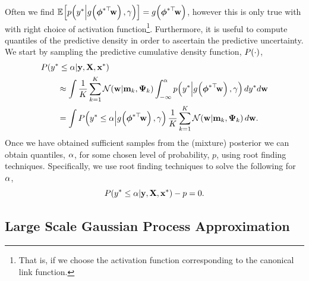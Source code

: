 \documentclass[11pt, oneside]{article}
\begin{document}
Often we find $\mathbb{E}_{}\!\left[{p\!\left({y^{*}}\middle\vert{\ensuremath{{g}_{}\!\left({{\boldsymbol\phi^{*\top}\!\mathbf{w}}}\right)},
        \ensuremath{\gamma}}\right)}\right] = {g}_{}\!\left({{\boldsymbol\phi^{*\top}\!\mathbf{w}}}\right)$, however this is only true
with with right choice of activation function\footnote{That is, if we choose
    the activation function corresponding to the canonical link function.}.
Furthermore, it is useful to compute quantiles of the predictive density in
order to ascertain the predictive uncertainty. We start by sampling the
predictive cumulative density function, $P\!\left({\cdot}\right)$,
\begin{align}
    &\ProbC{\targs\test \leq \cdfAlph}{\targ, \ins, \inss\test} \nonumber\\ 
    &\qquad\approx \int 
    \frac{1}{K} \sum^K_{k=1} \gausC{\weights}{\pomean_k, \dpocov_k}
    \int^{\cdfAlph}_{-\infty} 
    \probC{\targs\test}{\activ{\feats\testT\weights}, \lparam}
    d \targs\test d \weights \nonumber\\
    &\qquad= \int
    \ProbC{\targs\test \leq \cdfAlph}{\activ{\feats\testT\weights}, \lparam}
    \frac{1}{K} \sum^K_{k=1} \gausC{\weights}{\pomean_k, \dpocov_k}
    d \weights.
    \label{eq:lapexpec}
\end{align}
Once we have obtained sufficient samples from the (mixture) posterior we can
obtain quantiles, $\alpha$, for some chosen level of probability, $p$, using
root finding techniques. Specifically, we use root finding techniques to solve
the following for $\alpha$,
\begin{equation}
    P\!\left({y^{*} \leq \alpha}\middle\vert{\ensuremath{\mathbf{y}}, \ensuremath{\mathbf{X}}, \ensuremath{\mathbf{x}}\ensuremath{^{*}}}\right) - p = 0.
\end{equation}

\subsection{Large Scale Gaussian Process Approximation}
\end{document}
